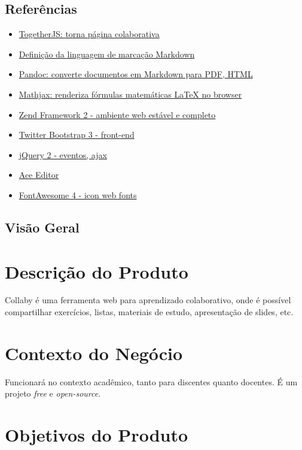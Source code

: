 \subsection{Referências}

\begin{itemize}
\item
  \href{https://togetherjs.com/}{TogetherJS: torna página colaborativa}
\item
  \href{http://daringfireball.net/projects/markdown/dingus}{Definição da
  linguagem de marcação Markdown}
\item
  \href{http://johnmacfarlane.net/pandoc/}{Pandoc: converte documentos
  em Markdown para PDF, HTML}
\item
  \href{http://www.mathjax.org/}{Mathjax: renderiza fórmulas matemáticas
  LaTeX no browser}
\item
  \href{http://framework.zend.com/zf2}{Zend Framework 2 - ambiente web
  estável e completo}
\item
  \href{http://getbootstrap.com/}{Twitter Bootstrap 3 - front-end}
\item
  \href{http://jquery.com/}{jQuery 2 - eventos, ajax}
\item
  \href{http://ace.c9.io/\#nav=about}{Ace Editor}
\item
  \href{http://FontAwesome.github.io/}{FontAwesome 4 - icon web fonts}
\end{itemize}
\subsection{Visão Geral}

\section{Descrição do Produto}

Collaby é uma ferramenta web para aprendizado colaborativo, onde é
possível compartilhar exercícios, listas, materiais de estudo,
apresentação de slides, etc.

\section{Contexto do Negócio}

Funcionará no contexto acadêmico, tanto para discentes quanto docentes.
É um projeto \emph{free} e \emph{open-source}.

\section{Objetivos do Produto}

